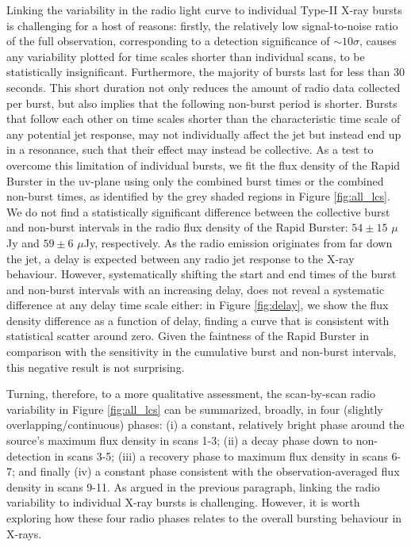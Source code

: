 \documentclass[fleqn,usenatbib]{mnras}
\begin{document}
Linking the variability in the radio light curve to individual Type-II X-ray bursts is challenging for a host of reasons: firstly, the relatively low signal-to-noise ratio of the full observation, corresponding to a detection significance of $\sim 10\sigma$, causes any variability plotted for time scales shorter than individual scans, to be statistically insignificant. Furthermore, the majority of bursts last for less than 30 seconds. This short duration not only reduces the amount of radio data collected per burst, but also implies that the following non-burst period is shorter. Bursts that follow each other on time scales shorter than the characteristic time scale of any potential jet response, may not individually affect the jet but instead end up in a resonance, such that their effect may instead be collective. As a test to overcome this limitation of individual bursts, we fit the flux density of the Rapid Burster in the uv-plane using only the combined burst times or the combined non-burst times, as identified by the grey shaded regions in Figure \ref{fig:all_lcs}. We do not find a statistically significant difference between the collective burst and non-burst intervals in the radio flux density of the Rapid Burster:  $54\pm15$ $\mu$Jy and $59\pm6$ $\mu$Jy, respectively. As the radio emission originates from far down the jet, a delay is expected between any radio jet response to the X-ray behaviour. However, systematically shifting the start and end times of the burst and non-burst intervals with an increasing delay, does not reveal a systematic difference at any delay time scale either: in Figure \ref{fig:delay}, we show the flux density difference as a function of delay, finding a curve that is consistent with statistical scatter around zero. Given the faintness of the Rapid Burster in comparison with the sensitivity in the cumulative burst and non-burst intervals, this negative result is not surprising. 

\label{sec:phases}
Turning, therefore, to a more qualitative assessment, the scan-by-scan radio variability in Figure \ref{fig:all_lcs} can be summarized, broadly, in four (slightly overlapping/continuous) phases: (i) a constant, relatively bright phase around the source's maximum flux density in scans 1-3; (ii) a decay phase down to non-detection in scans 3-5; (iii) a recovery phase to maximum flux density in scans 6-7; and finally (iv) a constant phase consistent with the observation-averaged flux density in scans 9-11. As argued in the previous paragraph, linking the radio variability to individual X-ray bursts is challenging. However, it is worth exploring how these four radio phases relates to the overall bursting behaviour in X-rays. 
\end{document}
